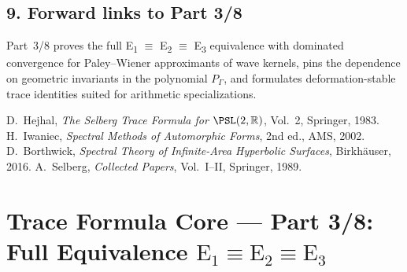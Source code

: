 \subsection*{9. Forward links to Part 3/8}\relax\hspace{0pt}
\label{subsec:tfc2-forward} %

\noindent
Part~3/8 proves the full E\textsubscript{1} $\equiv$ E\textsubscript{2} $\equiv$ E\textsubscript{3} equivalence with dominated convergence for Paley--Wiener approximants of wave kernels, pins the dependence on geometric invariants in the polynomial $P_\Gamma$, and formulates deformation-stable trace identities suited for arithmetic specializations.\relax\hspace{0pt}

\begin{thebibliography}{99} %
 D.~Hejhal, \emph{The Selberg Trace Formula for $\PSL(2,\mathbb{R})$}, Vol.~2, Springer, 1983. %
 H.~Iwaniec, \emph{Spectral Methods of Automorphic Forms}, 2nd ed., AMS, 2002. %
 D.~Borthwick, \emph{Spectral Theory of Infinite-Area Hyperbolic Surfaces}, Birkhäuser, 2016. %
 A.~Selberg, \emph{Collected Papers}, Vol.~I--II, Springer, 1989. %
\end{thebibliography}


\section*{Trace Formula Core — Part 3/8: Full Equivalence \texorpdfstring{$\mathrm{E}_1\equiv\mathrm{E}_2\equiv\mathrm{E}_3$}{E1≡E2≡E3}}\relax\hspace{0pt}
\label{sec:tfc-part3} %

